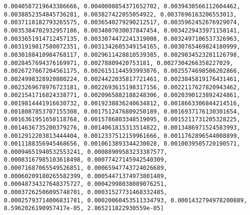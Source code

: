 \documentclass[11pt]{article}
\begin{document}
\begin{Verbatim}[commandchars=\\\{\}]
0.0040587219643386666, 0.0040008854371652702, 0.0039430566112604462, 0.0038852354845736281, 0.003827422055054922, 0.0037696163206553013, 0.0037118182793265575, 0.0036540279290212517, 0.0035962452676929074, 0.0035384702932957186, 0.0034807030037847454, 0.0034229433971158141, 0.0033651914712457135, 0.0033074472241319008, 0.0032497106537326963, 0.0031919817580072351, 0.0031342605349154165, 0.0030765469824180999, 0.0030188410984768117, 0.0029611428810539385, 0.0029034523281126798, 0.0028457694376169971, 0.00278809420753181, 0.0027304266358227029, 0.0026727667204561175, 0.0026151144593993076, 0.0025574698506202866, 0.0024998328920880224, 0.0024422035817721461, 0.0023845819176431461, 0.0023269678976723181, 0.0022693615198317156, 0.0022117627820943462, 0.0021541716824338771, 0.0020965882188248306, 0.0020390123892424861, 0.0019814441916630732, 0.0019238836240634812, 0.0018663306844214516, 0.0018087853707155308, 0.0017512476809250189, 0.0016937176130301654, 0.0016361951650118768, 0.0015786803348519095, 0.0015211731205328225, 0.0014636735200379276, 0.0014061815313514822, 0.0013486971524583993, 0.0012912203813444404, 0.0012337512159961666, 0.0011762896544008899, 0.0011188356945468656, 0.0010613893344230028, 0.0010039505720190571, 0.00094651940532553241, 0.00088909583233387577, 0.00083167985103618498, 0.00077427145942540309, 0.00071687065549526851, 0.00065947743724026689, 0.00060209180265582399, 0.00054471374973801489, 0.00048734327648375727, 0.00042998038089076251, 0.00037262506095748701, 0.00031527731468332485, 0.00025793714006831781, 0.00020060453511334793, 0.0001432794978200889, 8.5962026190957417e-05, 2.865211822930559e-05]

\end{Verbatim}
\end{document}
